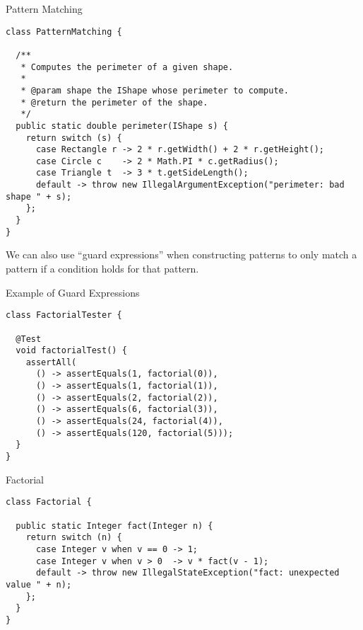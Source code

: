 \begin{cl}{Pattern Matching}
\begin{lstlisting}[language=MyJava]
class PatternMatching {

  /**
   * Computes the perimeter of a given shape.
   * 
   * @param shape the IShape whose perimeter to compute.
   * @return the perimeter of the shape.
   */
  public static double perimeter(IShape s) {
    return switch (s) {
      case Rectangle r -> 2 * r.getWidth() + 2 * r.getHeight();
      case Circle c    -> 2 * Math.PI * c.getRadius();
      case Triangle t  -> 3 * t.getSideLength();
      default -> throw new IllegalArgumentException("perimeter: bad shape " + s);
    };
  }
}
\end{lstlisting}
\end{cl}

We can also use ``guard expressions'' when constructing patterns to only match a pattern if a condition holds for that pattern.


\begin{cl}{Example of Guard Expressions} 
\begin{lstlisting}[language=MyJava]
class FactorialTester {

  @Test
  void factorialTest() {
    assertAll(
      () -> assertEquals(1, factorial(0)),
      () -> assertEquals(1, factorial(1)),
      () -> assertEquals(2, factorial(2)),
      () -> assertEquals(6, factorial(3)),
      () -> assertEquals(24, factorial(4)),
      () -> assertEquals(120, factorial(5)));
  }
}
\end{lstlisting}
\end{cl}

\begin{cl}{Factorial}
\begin{lstlisting}[language=MyJava]
class Factorial {

  public static Integer fact(Integer n) {
    return switch (n) {
      case Integer v when v == 0 -> 1;
      case Integer v when v > 0  -> v * fact(v - 1);
      default -> throw new IllegalStateException("fact: unexpected value " + n);
    };
  }
}
\end{lstlisting}
\end{cl}

